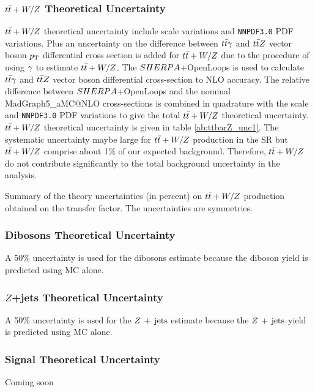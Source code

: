 \subsubsection*{$t\bar{t}+W/Z$ Theoretical Uncertainty}

\indent $t\bar{t}+W/Z$ theoretical uncertainty include scale variations and \texttt{NNPDF3.0} PDF variations.  Plus an uncertainty on the difference between $t\bar{t}\gamma$ and $t\bar{t} Z$ vector boson $p_{\mathrm{T}}$ differential cross section is added for $t\bar{t}+W/Z$ due to the procedure of using $\tt\gamma$ to estimate $t\bar{t}+W/Z$.  The $SHERPA$+OpenLoops is used to calculate $t\bar{t}\gamma$ and $t\bar{t} Z$ vector boson differential cross-section to NLO accuracy.  The relative difference between $SHERPA$+OpenLoops and the nominal {\sc MadGraph5\_aMC\/@NLO} cross-sections is combined in quadrature with the scale and \texttt{NNPDF3.0} PDF variations to give the total $t\bar{t}+W/Z$ theoretical uncertainty. \\

\indent $t\bar{t}+W/Z$ theoretical uncertainty is given in table \ref{ab:ttbarZ_unc1}.  The systematic uncertainty maybe large for $t\bar{t}+W/Z$ production in the SR but $t\bar{t}+W/Z$ comprise about 1\% of our expected background. Therefore, $t\bar{t}+W/Z$ do not contribute significantly to the total background uncertainty in the analysis. \\

  \begin{table}[!h]
    \begin{center} \footnotesize
      
    \end{center}
    \caption{Summary of the theory uncertainties (in percent) on $t\bar{t}+W/Z$ production obtained on the transfer factor. The uncertainties are symmetries.}
    \label{tab:ttbarZ_unc1}
  \end{table}

\subsubsection*{Dibosons Theoretical Uncertainty}

A 50\% uncertainty is used for the dibosons estimate because the diboson yield is predicted using MC alone.

\subsubsection*{$Z$+jets Theoretical Uncertainty}

A 50\% uncertainty is used for the $Z\,+\,\mathrm{jets}$ estimate because the $Z\,+\,\mathrm{jets}$ yield is predicted using MC alone.

\subsubsection*{Signal Theoretical Uncertainty}

  {\color{red} Coming soon}
